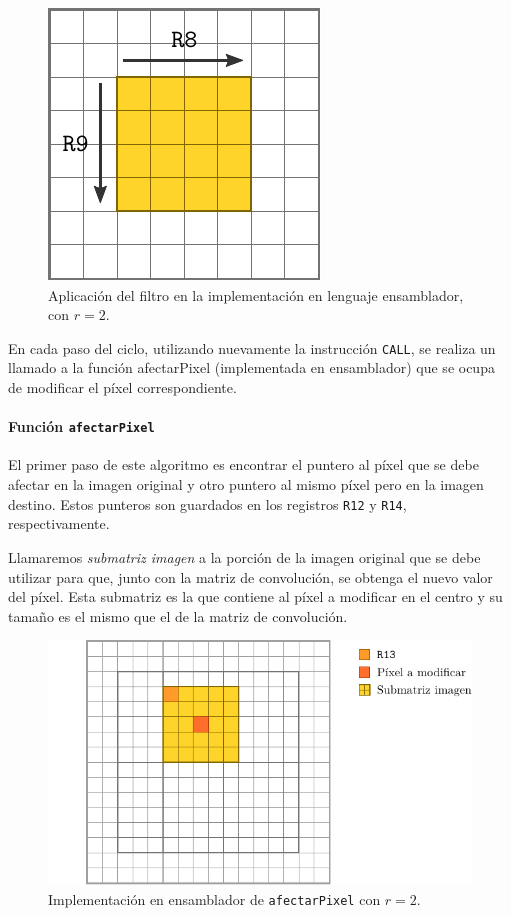       \begin{figure}
        \centering \includegraphics{imagenes/ciclos-asm.pdf}
        \caption{Aplicación del filtro en la implementación en lenguaje ensamblador, con $r = 2$.} \label{fig:ciclos-asm}
      \end{figure}

      En cada paso del ciclo, utilizando nuevamente la instrucción \texttt{CALL}, se realiza un llamado a la función afectarPixel (implementada en ensamblador) que se ocupa de modificar el píxel correspondiente. 

      \paragraph{Función \texttt{afectarPixel}}
        El primer paso de este algoritmo es encontrar el puntero al píxel que se debe afectar en la imagen original y otro puntero al mismo píxel pero en la imagen destino. Estos punteros son guardados en los registros \texttt{R12} y \texttt{R14}, respectivamente.   

        Llamaremos \emph{submatriz imagen} a la porción de la imagen original que se debe utilizar para que, junto con la matriz de convolución, se obtenga el nuevo valor del píxel. Esta submatriz es la que contiene al píxel a modificar en el centro y su tamaño es el mismo que el de la matriz de convolución. 
        
        \begin{figure}
          \centering \includegraphics{imagenes/afectar-pixel-asm.pdf}
          \caption{Implementación en ensamblador de \texttt{afectarPixel} con $r = 2$.} \label{fig:afectar-pixel-asm}
        \end{figure}

